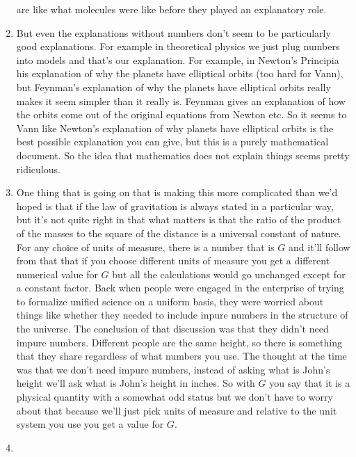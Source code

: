 \documentclass[12pt]{article}
\theoremstyle{definition}
\begin{document}
\begin{enumerate}
        are like what molecules were like before they played an explanatory
        role.
    \item
        But even the explanations without numbers don't seem to be particularly
        good explanations. For example in theoretical physics we just plug
        numbers into models and that's our explanation. For example, in
        Newton's Principia his explanation of why the planets have elliptical
        orbits (too hard for Vann), but Feynman's explanation of why the
        planets have elliptical orbits really makes it seem simpler than it
        really is. Feynman gives an explanation of how the orbits come out of
        the original equations from Newton etc. So it seems to Vann like
        Newton's explanation of why planets have elliptical orbits is the best
        possible explanation you can give, but this is a purely mathematical
        document. So the idea that mathematics does not explain things seems
        pretty ridiculous.
    \item
        One thing that is going on that is making this more complicated than
        we'd hoped is that if the law of gravitation is always stated in a
        particular way, but it's not quite right in that what matters is that
        the ratio of the product of the masses to the square of the distance is
        a universal constant of nature. For any choice of units of measure,
        there is a number that is $G$ and it'll follow from that that if you
        choose different units of measure you get a different numerical value
        for $G$ but all the calculations would go unchanged except for a
        constant factor. Back when people were engaged in the enterprise of
        trying to formalize unified science on a uniform basis, they were
        worried about things like whether they needed to include inpure numbers
        in the structure of the universe. The conclusion of that discussion was
        that they didn't need impure numbers. Different people are the same
        height, so there is something that they share regardless of what
        numbers you use. The thought at the time was that we don't need impure
        numbers, instead of asking what is John's height we'll ask what is
        John's height in inches. So with $G$ you say that it is a physical
        quantity with a somewhat odd status but we don't have to worry about
        that because we'll just pick units of measure and relative to the unit
        system you use you get a value for $G$.
    \item

\end{enumerate}
\end{document}
